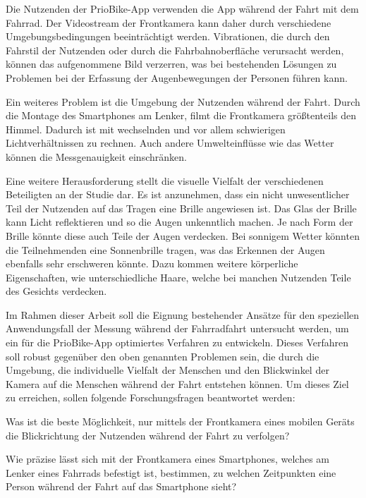 Die Nutzenden der PrioBike-App verwenden die App während der Fahrt mit dem Fahrrad. Der Videostream der Frontkamera kann daher durch verschiedene Umgebungsbedingungen beeinträchtigt werden. Vibrationen, die durch den Fahrstil der Nutzenden oder durch die Fahrbahnoberfläche verursacht werden, können das aufgenommene Bild verzerren, was bei bestehenden Lösungen zu Problemen bei der Erfassung der Augenbewegungen der Personen führen kann. 

Ein weiteres Problem ist die Umgebung der Nutzenden während der Fahrt. Durch die Montage des Smartphones am Lenker, filmt die Frontkamera größtenteils den Himmel. Dadurch ist mit wechselnden und vor allem schwierigen Lichtverhältnissen zu rechnen. Auch andere Umwelteinflüsse wie das Wetter können die Messgenauigkeit einschränken.

Eine weitere Herausforderung stellt die visuelle Vielfalt der verschiedenen Beteiligten an der Studie dar. Es ist anzunehmen, dass ein nicht unwesentlicher Teil der Nutzenden auf das Tragen eine Brille angewiesen ist. Das Glas der Brille kann Licht reflektieren und so die Augen unkenntlich machen. Je nach Form der Brille könnte diese auch Teile der Augen verdecken. Bei sonnigem Wetter könnten die Teilnehmenden eine Sonnenbrille tragen, was das Erkennen der Augen ebenfalls sehr erschweren könnte. Dazu kommen weitere körperliche Eigenschaften, wie unterschiedliche Haare, welche bei manchen Nutzenden Teile des Gesichts verdecken.
 
Im Rahmen dieser Arbeit soll die Eignung bestehender Ansätze für den speziellen Anwendungsfall der Messung während der Fahrradfahrt untersucht werden, um ein für die PrioBike-App optimiertes Verfahren zu entwickeln. Dieses Verfahren soll robust gegenüber den oben genannten Problemen sein, die durch die Umgebung, die individuelle Vielfalt der Menschen und den Blickwinkel der Kamera auf die Menschen während der Fahrt entstehen können. Um dieses Ziel zu erreichen, sollen folgende Forschungsfragen beantwortet werden:

\begin{researchquestion}\label{rq:best_possibility}
Was ist die beste Möglichkeit, nur mittels der Frontkamera eines mobilen Geräts die Blickrichtung der Nutzenden während der Fahrt zu verfolgen?
\end{researchquestion}

\begin{researchquestion}\label{rq:precision}
Wie präzise lässt sich mit der Frontkamera eines Smartphones, welches am
Lenker eines Fahrrads befestigt ist, bestimmen, zu welchen Zeitpunkten eine Person während der Fahrt auf das Smartphone sieht?
\end{researchquestion}

